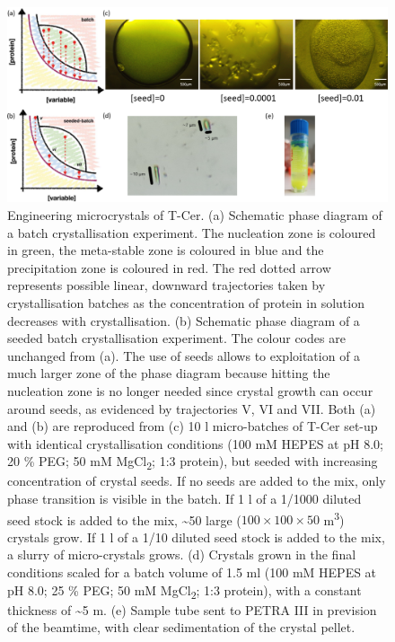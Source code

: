 \begin{figure}[H] %
    \centering
        \noindent \includegraphics[width=\textwidth]{images/T-Cer/Crystallisation_T-Cer.pdf}
    \hfill
    \caption{Engineering microcrystals of T-Cer. (a) Schematic phase diagram of a batch crystallisation experiment. The nucleation zone is coloured in green, the meta-stable zone is coloured in blue and the precipitation zone is coloured in red. The red dotted arrow represents possible linear, downward trajectories taken by crystallisation batches as the concentration of protein in solution decreases with crystallisation. (b)  Schematic phase diagram of a seeded batch crystallisation experiment. The colour codes are unchanged from (a). The use of seeds allows to exploitation of a much larger zone of the phase diagram because hitting the nucleation zone is no longer needed since crystal growth can occur around seeds, as evidenced by trajectories V, VI and VII. Both (a) and (b) are reproduced from \cite{bealeSuccessfulSamplePreparation2019} (c) 10 \textmu l micro-batches of T-Cer set-up with identical crystallisation conditions (100 mM HEPES at pH 8.0;  20 \% PEG; 50 mM MgCl\textsubscript{2}; 1:3 protein), but seeded with increasing concentration of crystal seeds. If no seeds are added to the mix, only phase transition is visible in the batch. If 1 \textmu l of a 1/1000 diluted seed stock is added to the mix, \textasciitilde 50 large (\(100 \times 100 \times 50\) \textmu m\textsuperscript{3}) crystals grow. If 1 \textmu l of a 1/10 diluted seed stock is added to the mix, a slurry of micro-crystals grows.  (d) Crystals grown in the final conditions scaled for a batch volume of 1.5 ml (100 mM HEPES at pH 8.0;  25 \% PEG; 50 mM MgCl\textsubscript{2}; 1:3 protein), with a constant thickness of \textasciitilde 5 \textmu m. (e) Sample tube sent to PETRA III in prevision of the beamtime, with clear sedimentation of the crystal pellet.}
    \label{fig:Crystallisation_T-Cer}
\end{figure}
